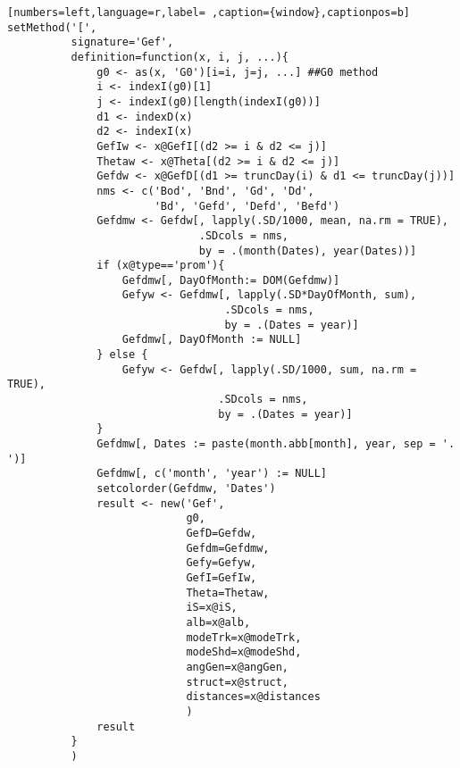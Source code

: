 \begin{lstlisting}[numbers=left,language=r,label= ,caption={window},captionpos=b]
setMethod('[',
          signature='Gef',
          definition=function(x, i, j, ...){
              g0 <- as(x, 'G0')[i=i, j=j, ...] ##G0 method
              i <- indexI(g0)[1]
              j <- indexI(g0)[length(indexI(g0))]
              d1 <- indexD(x)
              d2 <- indexI(x)
              GefIw <- x@GefI[(d2 >= i & d2 <= j)]
              Thetaw <- x@Theta[(d2 >= i & d2 <= j)]
              Gefdw <- x@GefD[(d1 >= truncDay(i) & d1 <= truncDay(j))]
              nms <- c('Bod', 'Bnd', 'Gd', 'Dd',
                       'Bd', 'Gefd', 'Defd', 'Befd')
              Gefdmw <- Gefdw[, lapply(.SD/1000, mean, na.rm = TRUE),
                              .SDcols = nms,
                              by = .(month(Dates), year(Dates))]
              if (x@type=='prom'){
                  Gefdmw[, DayOfMonth:= DOM(Gefdmw)]
                  Gefyw <- Gefdmw[, lapply(.SD*DayOfMonth, sum),
                                  .SDcols = nms,
                                  by = .(Dates = year)]
                  Gefdmw[, DayOfMonth := NULL]
              } else {
                  Gefyw <- Gefdw[, lapply(.SD/1000, sum, na.rm = TRUE),
                                 .SDcols = nms,
                                 by = .(Dates = year)]
              }
              Gefdmw[, Dates := paste(month.abb[month], year, sep = '. ')]
              Gefdmw[, c('month', 'year') := NULL]
              setcolorder(Gefdmw, 'Dates')
              result <- new('Gef',
                            g0,
                            GefD=Gefdw,
                            Gefdm=Gefdmw,
                            Gefy=Gefyw,
                            GefI=GefIw,
                            Theta=Thetaw,
                            iS=x@iS,
                            alb=x@alb,
                            modeTrk=x@modeTrk,
                            modeShd=x@modeShd,
                            angGen=x@angGen,
                            struct=x@struct,
                            distances=x@distances
                            )
              result
          }
          )



\end{lstlisting}
